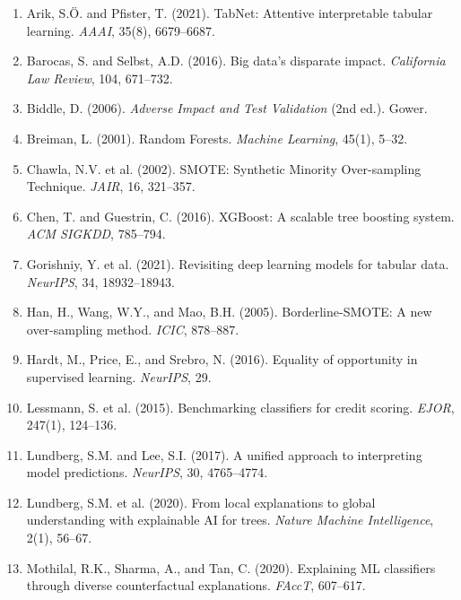 \documentclass[12pt]{report}
\begin{document}
\begin{enumerate}[nosep]

\item Arik, S.\"{O}. and Pfister, T. (2021). TabNet: Attentive interpretable tabular learning. \emph{AAAI}, 35(8), 6679--6687.

\item Barocas, S. and Selbst, A.D. (2016). Big data's disparate impact. \emph{California Law Review}, 104, 671--732.

\item Biddle, D. (2006). \emph{Adverse Impact and Test Validation} (2nd ed.). Gower.

\item Breiman, L. (2001). Random Forests. \emph{Machine Learning}, 45(1), 5--32.

\item Chawla, N.V. et al. (2002). SMOTE: Synthetic Minority Over-sampling Technique. \emph{JAIR}, 16, 321--357.

\item Chen, T. and Guestrin, C. (2016). XGBoost: A scalable tree boosting system. \emph{ACM SIGKDD}, 785--794.

\item Gorishniy, Y. et al. (2021). Revisiting deep learning models for tabular data. \emph{NeurIPS}, 34, 18932--18943.

\item Han, H., Wang, W.Y., and Mao, B.H. (2005). Borderline-SMOTE: A new over-sampling method. \emph{ICIC}, 878--887.

\item Hardt, M., Price, E., and Srebro, N. (2016). Equality of opportunity in supervised learning. \emph{NeurIPS}, 29.

\item Lessmann, S. et al. (2015). Benchmarking classifiers for credit scoring. \emph{EJOR}, 247(1), 124--136.

\item Lundberg, S.M. and Lee, S.I. (2017). A unified approach to interpreting model predictions. \emph{NeurIPS}, 30, 4765--4774.

\item Lundberg, S.M. et al. (2020). From local explanations to global understanding with explainable AI for trees. \emph{Nature Machine Intelligence}, 2(1), 56--67.

\item Mothilal, R.K., Sharma, A., and Tan, C. (2020). Explaining ML classifiers through diverse counterfactual explanations. \emph{FAccT}, 607--617.


\end{enumerate}
\end{document}
